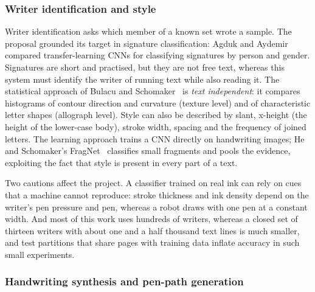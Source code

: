 \subsubsection{Writer identification and style}
\label{sec:lit-writer}

Writer identification asks which member of a known set wrote a sample. The proposal grounded its target in signature classification: Agduk and Aydemir~\cite{agduk2022} compared transfer-learning CNNs for classifying signatures by person and gender. Signatures are short and practised, but they are not free text, whereas this system must identify the writer of running text while also reading it. The statistical approach of Bulacu and Schomaker~\cite{bulacu2007} is \emph{text independent}: it compares histograms of contour direction and curvature (texture level) and of characteristic letter shapes (allograph level). Style can also be described by slant, x-height (the height of the lower-case body), stroke width, spacing and the frequency of joined letters. The learning approach trains a CNN directly on handwriting images; He and Schomaker's FragNet~\cite{he2020} classifies small fragments and pools the evidence, exploiting the fact that style is present in every part of a text.

Two cautions affect the project. A classifier trained on real ink can rely on cues that a machine cannot reproduce: stroke thickness and ink density depend on the writer's pen pressure and pen, whereas a robot draws with one pen at a constant width. And most of this work uses hundreds of writers, whereas a closed set of thirteen writers with about one and a half thousand text lines is much smaller, and test partitions that share pages with training data inflate accuracy in such small experiments.

\subsubsection{Handwriting synthesis and pen-path generation}
\label{sec:lit-synth}

